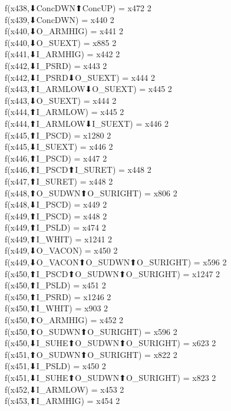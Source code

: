 f(x438,⬇ConcDWN⬆ConcUP) = x472 {2} \\
f(x439,⬇ConcDWN) = x440 {2} \\
f(x440,⬇O_ARMHIG) = x441 {2} \\
f(x440,⬇O_SUEXT) = x885 {2} \\
f(x441,⬇I_ARMHIG) = x442 {2} \\
f(x442,⬇I_PSRD) = x443 {2} \\
f(x442,⬇I_PSRD⬇O_SUEXT) = x444 {2} \\
f(x443,⬆I_ARMLOW⬇O_SUEXT) = x445 {2} \\
f(x443,⬇O_SUEXT) = x444 {2} \\
f(x444,⬆I_ARMLOW) = x445 {2} \\
f(x444,⬆I_ARMLOW⬇I_SUEXT) = x446 {2} \\
f(x445,⬆I_PSCD) = x1280 {2} \\
f(x445,⬇I_SUEXT) = x446 {2} \\
f(x446,⬆I_PSCD) = x447 {2} \\
f(x446,⬆I_PSCD⬆I_SURET) = x448 {2} \\
f(x447,⬆I_SURET) = x448 {2} \\
f(x448,⬆O_SUDWN⬆O_SURIGHT) = x806 {2} \\
f(x448,⬇I_PSCD) = x449 {2} \\
f(x449,⬆I_PSCD) = x448 {2} \\
f(x449,⬆I_PSLD) = x474 {2} \\
f(x449,⬆I_WHIT) = x1241 {2} \\
f(x449,⬇O_VACON) = x450 {2} \\
f(x449,⬇O_VACON⬆O_SUDWN⬆O_SURIGHT) = x596 {2} \\
f(x450,⬆I_PSCD⬆O_SUDWN⬆O_SURIGHT) = x1247 {2} \\
f(x450,⬆I_PSLD) = x451 {2} \\
f(x450,⬆I_PSRD) = x1246 {2} \\
f(x450,⬆I_WHIT) = x903 {2} \\
f(x450,⬆O_ARMHIG) = x452 {2} \\
f(x450,⬆O_SUDWN⬆O_SURIGHT) = x596 {2} \\
f(x450,⬇I_SUHE⬆O_SUDWN⬆O_SURIGHT) = x623 {2} \\
f(x451,⬆O_SUDWN⬆O_SURIGHT) = x822 {2} \\
f(x451,⬇I_PSLD) = x450 {2} \\
f(x451,⬇I_SUHE⬆O_SUDWN⬆O_SURIGHT) = x823 {2} \\
f(x452,⬇I_ARMLOW) = x453 {2} \\
f(x453,⬆I_ARMHIG) = x454 {2} \\
